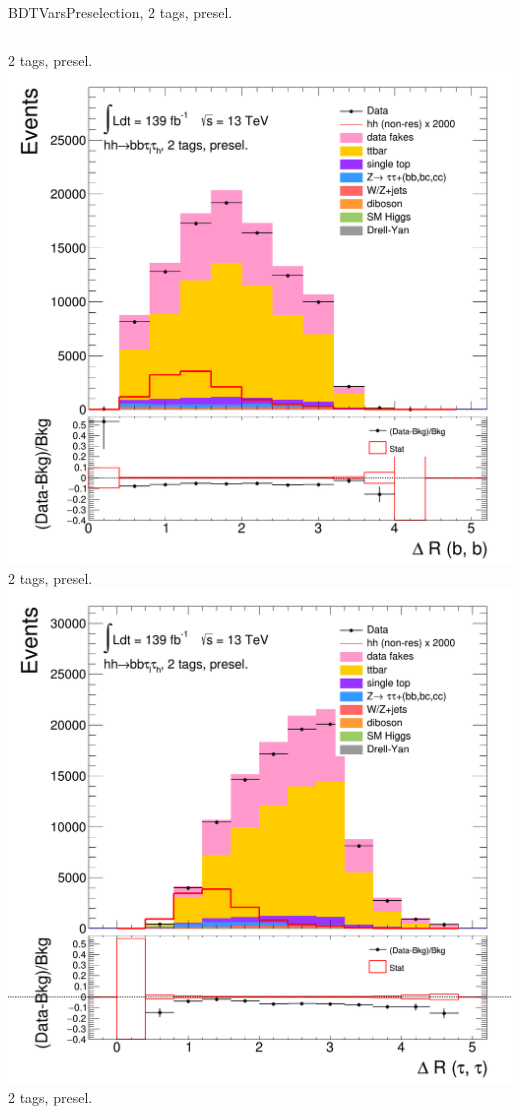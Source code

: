 \begin{frame}{BDTVarsPreselection, 2 tags, presel.}
\begin{columns}[c]
    2 tags, presel.
    \centering\includegraphics[width=\textwidth]{C_2tag2pjet_0ptv_dRbb}\\
    2 tags, presel.
    \centering\includegraphics[width=\textwidth]{C_2tag2pjet_0ptv_DRTauTau}\\
    2 tags, presel.
  \end{columns}
\end{frame}

